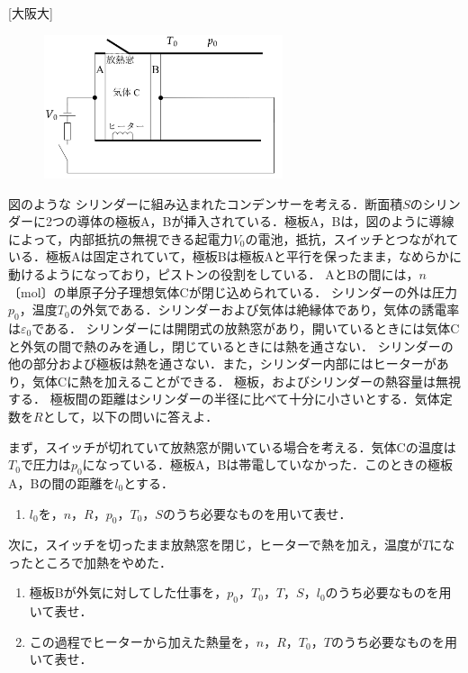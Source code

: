 


\noindent
{} [大阪大]

\begin{figure}
  \centering
  \includegraphics[width=7cm]{fig/fig_4_24.pdf}
\end{figure}
図のような
 シリンダーに組み込まれたコンデンサーを考える．断面積$S$のシリンダーに2つの導体の極板A，Bが挿入されている．極板A，Bは，図のように導線によって，内部抵抗の無視できる起電力$V_0$の電池，抵抗，スイッチとつながれている．極板Aは固定されていて，極板Bは極板Aと平行を保ったまま，なめらかに動けるようになっており，ピストンの役割をしている．
AとBの間には，$n$〔mol〕の単原子分子理想気体Cが閉じ込められている．
シリンダーの外は圧力$p_0$，温度$T_0$の外気である．シリンダーおよび気体は絶縁体であり，気体の誘電率は$\varepsilon_0$である．
シリンダーには開閉式の放熱窓があり，開いているときには気体Cと外気の間で熱のみを通し，閉じているときには熱を通さない．
シリンダーの他の部分および極板は熱を通さない．また，シリンダー内部にはヒーターがあり，気体Cに熱を加えることができる．
極板，およびシリンダーの熱容量は無視する．
極板間の距離はシリンダーの半径に比べて十分に小さいとする．気体定数を$R$として，以下の問いに答えよ．

まず，スイッチが切れていて放熱窓が開いている場合を考える．気体Cの温度は$T_0$で圧力は$p_0$になっている．極板A，Bは帯電していなかった．このときの極板A，Bの間の距離を$l_0$とする．
\begin{enumerate}[(1)]
  \item $l_0$を，$n$，$R$，$p_0$，$T_0$，$S$のうち必要なものを用いて表せ．
\end{enumerate}

次に，スイッチを切ったまま放熱窓を閉じ，ヒーターで熱を加え，温度が$T$になったところで加熱をやめた．
\begin{enumerate}[(1), resume]
  \item  極板Bが外気に対してした仕事を，$p_0$，$T_0$，$T$，$S$，$l_0$のうち必要なものを用いて表せ．　
  \item この過程でヒーターから加えた熱量を，$n$，$R$，$T_0$，$T$のうち必要なものを用いて表せ．
\end{enumerate}

